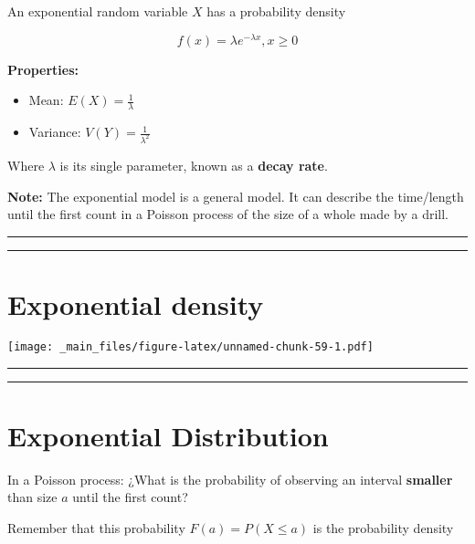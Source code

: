 \documentclass[
]{book}
\providecommand{\tightlist}{%
  \setlength{\itemsep}{0pt}\setlength{\parskip}{0pt}}
\begin{document}
An exponential random variable \(X\) has a probability density

\[f(x)=\lambda e^{-\lambda x}, x\geq 0\]

\textbf{Properties:}

\begin{itemize}
\tightlist
\item
  Mean: \(E(X)=\frac{1}{\lambda}\)
\item
  Variance: \(V(Y)=\frac{1}{\lambda^2}\)
\end{itemize}

Where \(\lambda\) is its single parameter, known as a \textbf{decay rate}.

\textbf{Note:} The exponential model is a general model. It can describe the time/length until the first count in a Poisson process of the size of a whole made by a drill.

\begin{center}\rule{0.5\linewidth}{0.5pt}\end{center}

\begin{center}\rule{0.5\linewidth}{0.5pt}\end{center}

\hypertarget{exponential-density-4}{%
\section{Exponential density}\label{exponential-density-4}}

\texttt{[image: \_main\_files/figure-latex/unnamed-chunk-59-1.pdf]}

\begin{center}\rule{0.5\linewidth}{0.5pt}\end{center}

\begin{center}\rule{0.5\linewidth}{0.5pt}\end{center}

\hypertarget{exponential-distribution}{%
\section{Exponential Distribution}\label{exponential-distribution}}

In a Poisson process: ¿What is the probability of observing an interval \textbf{smaller} than size \(a\) until the first count?

Remember that this probability \(F(a)=P(X \leq a)\) is the probability density
\end{document}
